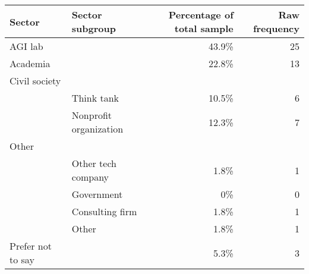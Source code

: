 \documentclass{article}
\begin{document}
\begin{table}[ht]
\centering
\begin{tabularx}{1\textwidth}{>{\raggedright\arraybackslash}X >{\raggedright\arraybackslash}X r r}
\toprule
\textbf{Sector} & \textbf{Sector subgroup} & \textbf{Percentage of total sample} & \textbf{Raw frequency} \\
\midrule
AGI lab & & 43.9\% & 25 \\
\midrule
Academia & & 22.8\% & 13 \\
\midrule
Civil society & & & \\
& Think tank & 10.5\% & 6 \\
& Nonprofit organization & 12.3\% & 7 \\
\midrule
Other & & & \\
& Other tech company & 1.8\% & 1 \\
& Government & 0\% & 0 \\
& Consulting firm & 1.8\% & 1 \\
& Other & 1.8\% & 1 \\
\midrule
Prefer not to say & & 5.3\% & 3 \\
\bottomrule
\end{tabularx}
\end{table}
\end{document}
